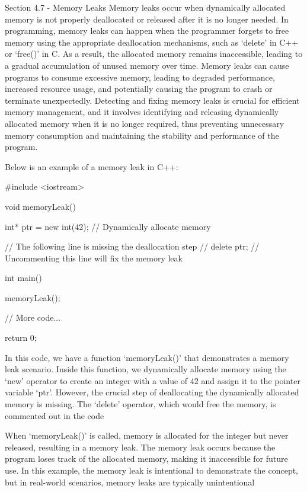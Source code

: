 \begin{notes}{Section 4.7 - Memory Leaks}
    Memory leaks occur when dynamically allocated memory is not properly deallocated or released after it is no longer needed. In programming, memory leaks can happen when the programmer forgets to free memory using the appropriate deallocation mechanisms, such 
    as `delete' in C++ or `free()' in C. As a result, the allocated memory remains inaccessible, leading to a gradual accumulation of unused memory over time. Memory leaks can cause programs to consume excessive memory, leading to degraded performance, increased 
    resource usage, and potentially causing the program to crash or terminate unexpectedly. Detecting and fixing memory leaks is crucial for efficient memory management, and it involves identifying and releasing dynamically allocated memory when it is no longer 
    required, thus preventing unnecessary memory consumption and maintaining the stability and performance of the program.
    
    \begin{highlight}
        Below is an example of a memory leak in C++:
        
    \begin{code}[C++]   
    #include <iostream>

    void memoryLeak() {
        int* ptr = new int(42);  // Dynamically allocate memory
    
        // The following line is missing the deallocation step
        // delete ptr;  // Uncommenting this line will fix the memory leak
    }
    
    int main() {
        memoryLeak();
    
        // More code...
    
        return 0;
    }
    \end{code}
        In this code, we have a function `memoryLeak()' that demonstrates a memory leak scenario. Inside this function, we dynamically allocate memory using the `new' operator to create an integer with a value of 42 and assign it to the pointer variable `ptr'. 
        However, the crucial step of deallocating the dynamically allocated memory is missing. The `delete' operator, which would free the memory, is commented out in the code
        
        When `memoryLeak()' is called, memory is allocated for the integer but never released, resulting in a memory leak. The memory leak occurs because the program loses track of the allocated memory, making it inaccessible for future use. In this example, 
        the memory leak is intentional to demonstrate the concept, but in real-world scenarios, memory leaks are typically unintentional
        

\end{highlight}
\end{notes}
